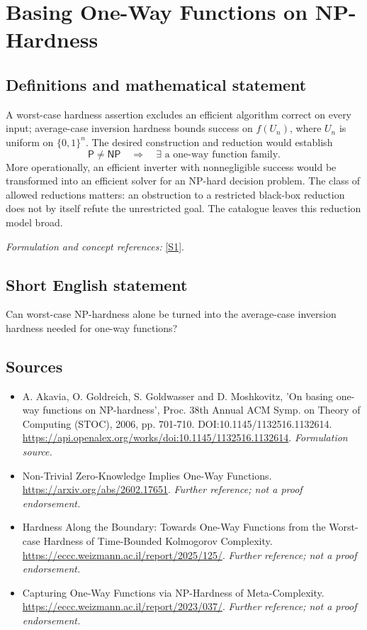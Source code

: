 \documentclass[11pt]{article}
\begin{document}
\section*{\texorpdfstring{Basing One-Way Functions on NP-Hardness}{Basing One-Way Functions on NP-Hardness}}\label{33}
\subsection{Definitions and mathematical statement}
A worst-case hardness assertion excludes an efficient algorithm correct on every input; average-case inversion hardness bounds success on $f(U_n)$, where $U_n$ is uniform on $\{0,1\}^n$. The desired construction and reduction would establish
\[
 \mathsf P\ne\mathsf{NP}\quad\Longrightarrow\quad
 \exists\text{ a one-way function family}.
\]
More operationally, an efficient inverter with nonnegligible success would be transformed into an efficient solver for an NP-hard decision problem. The class of allowed reductions matters: an obstruction to a restricted black-box reduction does not by itself refute the unrestricted goal. The catalogue leaves this reduction model broad.
\par\smallskip\textit{Formulation and concept references:} \href{https://api.openalex.org/works/doi:10.1145/1132516.1132614}{[S1]}.

\subsection{Short English statement}
Can worst-case NP-hardness alone be turned into the average-case inversion hardness needed for one-way functions?
\subsection{Sources}
\begin{itemize}
\item[S1]A. Akavia, O. Goldreich, S. Goldwasser and D. Moshkovitz, 'On basing one-way functions on NP-hardness', Proc. 38th Annual ACM Symp. on Theory of Computing (STOC), 2006, pp. 701-710. DOI:10.1145/1132516.1132614.
\url{https://api.openalex.org/works/doi:10.1145/1132516.1132614}.
\textit{Formulation source.}
\item[S2]Non-Trivial Zero-Knowledge Implies One-Way Functions.
\url{https://arxiv.org/abs/2602.17651}.
\textit{Further reference; not a proof endorsement.}
\item[S3]Hardness Along the Boundary: Towards One-Way Functions from the Worst-case Hardness of Time-Bounded Kolmogorov Complexity.
\url{https://eccc.weizmann.ac.il/report/2025/125/}.
\textit{Further reference; not a proof endorsement.}
\item[S4]Capturing One-Way Functions via NP-Hardness of Meta-Complexity.
\url{https://eccc.weizmann.ac.il/report/2023/037/}.
\textit{Further reference; not a proof endorsement.}
\end{itemize}
\end{document}
